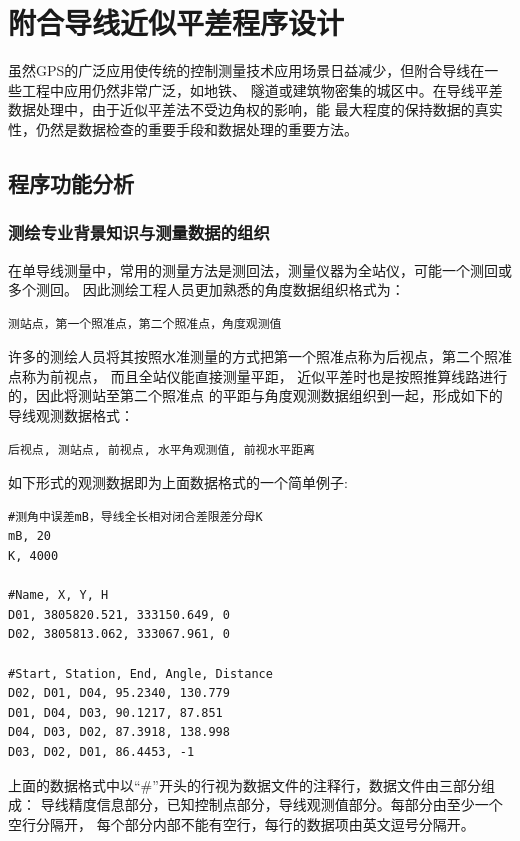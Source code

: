 
\chapter{附合导线近似平差程序设计}

虽然GPS的广泛应用使传统的控制测量技术应用场景日益减少，但附合导线在一些工程中应用仍然非常广泛，如地铁、
隧道或建筑物密集的城区中。在导线平差数据处理中，由于近似平差法不受边角权的影响，能
最大程度的保持数据的真实性，仍然是数据检查的重要手段和数据处理的重要方法。

\section{程序功能分析}

\subsection{测绘专业背景知识与测量数据的组织}
在单导线测量中，常用的测量方法是测回法，测量仪器为全站仪，可能一个测回或多个测回。
因此测绘工程人员更加熟悉的角度数据组织格式为：

\begin{verbatim}
测站点，第一个照准点，第二个照准点，角度观测值
\end{verbatim}

许多的测绘人员将其按照水准测量的方式把第一个照准点称为后视点，第二个照准点称为前视点，
而且全站仪能直接测量平距， 近似平差时也是按照推算线路进行的，因此将测站至第二个照准点
的平距与角度观测数据组织到一起，形成如下的导线观测数据格式：

\begin{verbatim}
后视点, 测站点, 前视点, 水平角观测值, 前视水平距离
\end{verbatim}

如下形式的观测数据即为上面数据格式的一个简单例子:

\begin{verbatim}
#测角中误差mB，导线全长相对闭合差限差分母K
mB, 20
K, 4000

#Name, X, Y, H
D01, 3805820.521, 333150.649, 0
D02, 3805813.062, 333067.961, 0

#Start, Station, End, Angle, Distance
D02, D01, D04, 95.2340, 130.779
D01, D04, D03, 90.1217, 87.851
D04, D03, D02, 87.3918, 138.998
D03, D02, D01, 86.4453, -1
\end{verbatim}

上面的数据格式中以``\#''开头的行视为数据文件的注释行，数据文件由三部分组成：
导线精度信息部分，已知控制点部分，导线观测值部分。每部分由至少一个空行分隔开，
每个部分内部不能有空行，每行的数据项由英文逗号分隔开。

